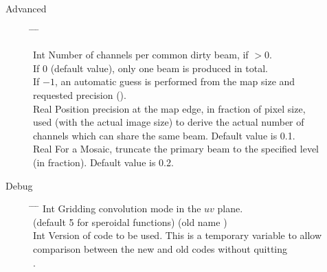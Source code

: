 \begin{description}
\item[Advanced]\mbox{}
\begin{tabbing}
\hspace{0.0cm} \= \hspace{3.4cm} \= \hspace{2cm} \= \kill

\>  \> Int \> Number of channels per common dirty beam, if $> 0$. \\
                \> \> \> If 0 (default value),  only one beam is produced in total. \\
                \> \> \> If $-1$, an automatic guess is performed from the map size and \\
                \> \> \> requested precision (). \\
\>   \> Real \> Position precision at the map edge, in fraction of pixel size, \\
                \> \> \> used (with the actual image size) to  derive  the  actual number of \\
                \> \> \> channels which can share the same beam.  Default value is 0.1. \\
\>  \>  Real \> For a Mosaic, truncate the primary beam to the specified level\\
              \> \> \> (in fraction). Default value is 0.2.\\
\end{tabbing}
\end{description}

\begin{description}
\item[Debug]\mbox{}
\begin{tabbing}
\hspace{0.0cm} \= \hspace{4.cm} \= \hspace{1.4cm} \= \kill
\>   \> Int \>  Gridding convolution mode in the $uv$ plane. \\
		\> \> \> (default 5 for speroidal functions) (old name ) \\
\>  \> Int \>  Version of code to be used. This is a temporary variable to allow \\
                \> \> \>  comparison between the new and old codes without quitting \\
                \> \> \> \imager{}. \\
\end{tabbing}
\end{description}


